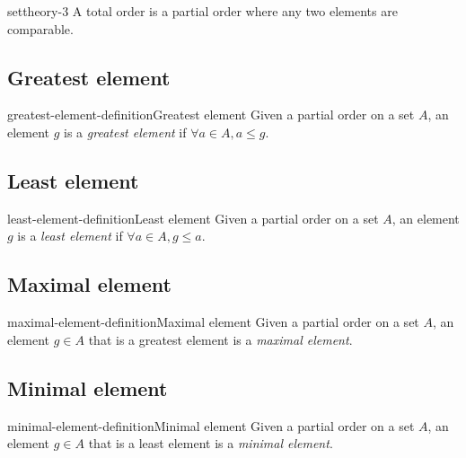 \documentclass[preview]{standalone}
\begin{document}
\begin{snippet}{settheory-3}
A total order is a partial order where any two elements are comparable.
\end{snippet}

\subsection{Greatest element}

\begin{snippetdefinition}{greatest-element-definition}{Greatest element}
    Given a partial order on a set \(A\), an element \(g\) is a \textit{greatest element}
    if \(\forall a\in A, a \leq g\).
\end{snippetdefinition}

\subsection{Least element}

\begin{snippetdefinition}{least-element-definition}{Least element}
    Given a partial order on a set \(A\), an element \(g\) is a \textit{least element}
    if \(\forall a\in A, g \leq a\).
\end{snippetdefinition}

\subsection{Maximal element}

\begin{snippetdefinition}{maximal-element-definition}{Maximal element}
    Given a partial order on a set \(A\), an element \(g\in A\) that is
    a greatest element is a \textit{maximal element}.
\end{snippetdefinition}

\subsection{Minimal element}

\begin{snippetdefinition}{minimal-element-definition}{Minimal element}
    Given a partial order on a set \(A\), an element \(g\in A\) that is
    a least element is a \textit{minimal element}.
\end{snippetdefinition}
\end{document}
